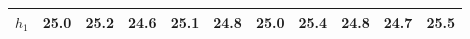 
        \begin{tabular}{c|*{10}{c}}
            \hline
            \hline
                \(h_{1}\) & 25.0 & 25.2 & 24.6 & 25.1 & 24.8 & 25.0 & 25.4 & 24.8 & 24.7 & 25.5 \\
            \hline
            
            \hline
            \hline
        \end{tabular}
        
